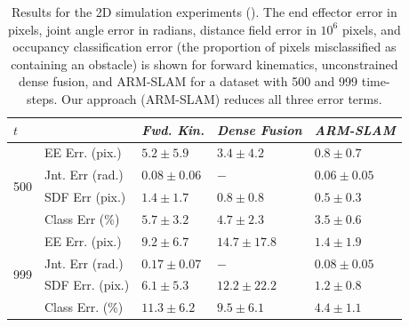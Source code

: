 \begin{table}
 \begin{tabular}{*5l}
          \hline
             $t$ &      & \textit{Fwd. Kin.}  & \textit{Dense Fusion} & \textit{ARM-SLAM} \\ \hline
             \multirow{4}{*}{500} & EE Err. (pix.)      & $5.2 \pm 5.9$ & $3.4 \pm 4.2$ & $\mathbf{0.8 \pm 0.7}$ \\ 
              & Jnt. Err (rad.)                 & $0.08 \pm 0.06$ & $ - $ & $\mathbf{0.06 \pm 0.05}$ \\
              & SDF Err (pix.)                  & $1.4 \pm 1.7$ & $0.8 \pm 0.8$ & $\mathbf{0.5 \pm 0.3}$ \\ 
              & Class Err (\%)                     & $5.7 \pm 3.2$ & $4.7 \pm 2.3$ & $\mathbf{3.5 \pm 0.6}$ \\ \hline
              
              \multirow{4}{*}{999} & EE Err. (pix.)    & $9.2 \pm 6.7$ & $14.7 \pm 17.8$ & $\mathbf{1.4 \pm 1.9}$ \\ 
              & Jnt. Err (rad.)                   & $0.17 \pm 0.07$ & $ - $ & $\mathbf{0.08 \pm 0.05}$ \\
              & SDF Err. (pix.)                   & $6.1 \pm 5.3$ & $12.2 \pm 22.2$ & $\mathbf{1.2 \pm 0.8}$ \\ 
              & Class Err. (\%)                     & $11.3 \pm 6.2$ & $9.5 \pm 6.1$ & $\mathbf{4.4 \pm 1.1}$ \\
              \hline
    \end{tabular} 
    \caption{Results for the 2D simulation experiments (). The end effector error in pixels, joint angle error in radians, distance field error in $10^6$ pixels, and occupancy classification error (the proportion of pixels misclassified as containing an obstacle) is shown for forward kinematics, unconstrained dense fusion, and ARM-SLAM for a dataset with 500 and 999 time-steps. Our approach (ARM-SLAM) reduces all three error terms.}
    \label{table:2d_experiment_data}
\end{table}


